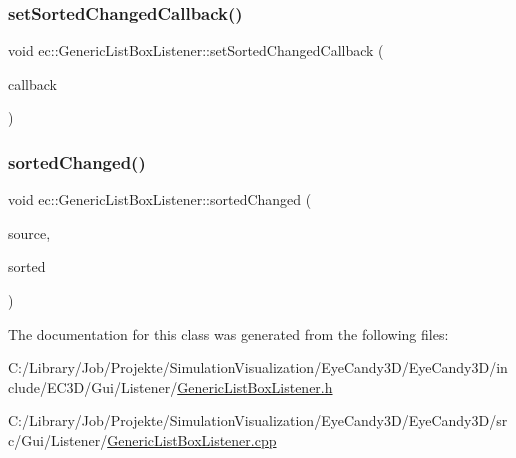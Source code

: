 \mbox{\label{classec_1_1_generic_list_box_listener_adbce2672e6173f9f2b09d6ba9df09828}} 
\subsubsection{\texorpdfstring{set\+Sorted\+Changed\+Callback()}{setSortedChangedCallback()}}
{\footnotesize\ttfamily void ec\+::\+Generic\+List\+Box\+Listener\+::set\+Sorted\+Changed\+Callback (\begin{DoxyParamCaption}\item[{const \mbox{\hyperlink{classec_1_1_generic_list_box_listener_a42ecf66ec6c32bbe9fe0174b2b1a527f}{Sorted\+Changed\+\_\+\+Callback}} \&}]{callback }\end{DoxyParamCaption})}

\mbox{\label{classec_1_1_generic_list_box_listener_a52b32a361ac45c09f0a3ada6e52334d6}} 
\subsubsection{\texorpdfstring{sorted\+Changed()}{sortedChanged()}}
{\footnotesize\ttfamily void ec\+::\+Generic\+List\+Box\+Listener\+::sorted\+Changed (\begin{DoxyParamCaption}\item[{agui\+::\+List\+Box $\ast$}]{source,  }\item[{bool}]{sorted }\end{DoxyParamCaption})\hspace{0.3cm}{\ttfamily [override]}}



The documentation for this class was generated from the following files\+:\begin{DoxyCompactItemize}
\item 
C\+:/\+Library/\+Job/\+Projekte/\+Simulation\+Visualization/\+Eye\+Candy3\+D/\+Eye\+Candy3\+D/include/\+E\+C3\+D/\+Gui/\+Listener/\mbox{\hyperlink{_generic_list_box_listener_8h}{Generic\+List\+Box\+Listener.\+h}}\item 
C\+:/\+Library/\+Job/\+Projekte/\+Simulation\+Visualization/\+Eye\+Candy3\+D/\+Eye\+Candy3\+D/src/\+Gui/\+Listener/\mbox{\hyperlink{_generic_list_box_listener_8cpp}{Generic\+List\+Box\+Listener.\+cpp}}\end{DoxyCompactItemize}
